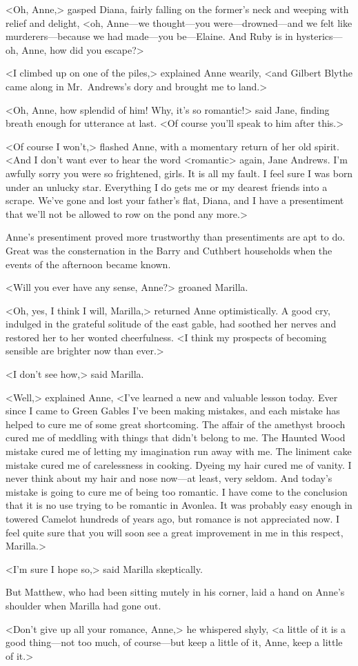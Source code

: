 <Oh, Anne,> gasped Diana, fairly falling on the former's neck and weeping with relief and delight, <oh, Anne—we thought—you were—drowned—and we felt like murderers—because we had made—you be—Elaine. And Ruby is in hysterics—oh, Anne, how did you escape?>

<I climbed up on one of the piles,> explained Anne wearily, <and Gilbert Blythe came along in Mr.~Andrews's dory and brought me to land.>

<Oh, Anne, how splendid of him! Why, it's so romantic!> said Jane, finding breath enough for utterance at last. <Of course you'll speak to him after this.>

<Of course I won't,> flashed Anne, with a momentary return of her old spirit. <And I don't want ever to hear the word <romantic> again, Jane Andrews. I'm awfully sorry you were so frightened, girls. It is all my fault. I feel sure I was born under an unlucky star. Everything I do gets me or my dearest friends into a scrape. We've gone and lost your father's flat, Diana, and I have a presentiment that we'll not be allowed to row on the pond any more.>

Anne's presentiment proved more trustworthy than presentiments are apt to do. Great was the consternation in the Barry and Cuthbert households when the events of the afternoon became known.

<Will you ever have any sense, Anne?> groaned Marilla.

<Oh, yes, I think I will, Marilla,> returned Anne optimistically. A good cry, indulged in the grateful solitude of the east gable, had soothed her nerves and restored her to her wonted cheerfulness. <I think my prospects of becoming sensible are brighter now than ever.>

<I don't see how,> said Marilla.

<Well,> explained Anne, <I've learned a new and valuable lesson today. Ever since I came to Green Gables I've been making mistakes, and each mistake has helped to cure me of some great shortcoming. The affair of the amethyst brooch cured me of meddling with things that didn't belong to me. The Haunted Wood mistake cured me of letting my imagination run away with me. The liniment cake mistake cured me of carelessness in cooking. Dyeing my hair cured me of vanity. I never think about my hair and nose now—at least, very seldom. And today's mistake is going to cure me of being too romantic. I have come to the conclusion that it is no use trying to be romantic in Avonlea. It was probably easy enough in towered Camelot hundreds of years ago, but romance is not appreciated now. I feel quite sure that you will soon see a great improvement in me in this respect, Marilla.>

<I'm sure I hope so,> said Marilla skeptically.

But Matthew, who had been sitting mutely in his corner, laid a hand on Anne's shoulder when Marilla had gone out.

<Don't give up all your romance, Anne,> he whispered shyly, <a little of it is a good thing—not too much, of course—but keep a little of it, Anne, keep a little of it.>